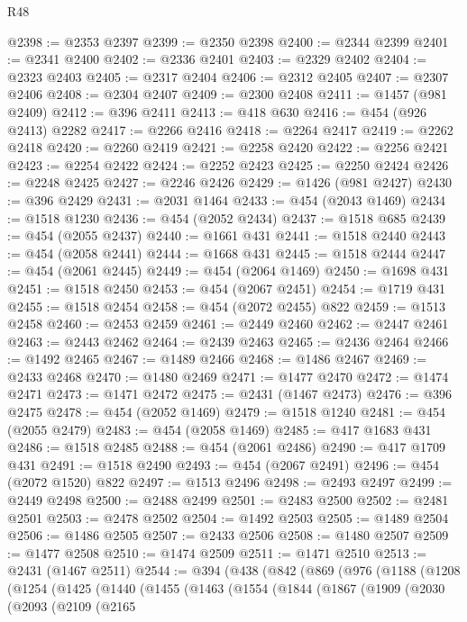 \begin{lexlean}{R48}
\begin{coremodule}
@2398 := @2353 @2397
@2399 := @2350 @2398
@2400 := @2344 @2399
@2401 := @2341 @2400
@2402 := @2336 @2401
@2403 := @2329 @2402
@2404 := @2323 @2403
@2405 := @2317 @2404
@2406 := @2312 @2405
@2407 := @2307 @2406
@2408 := @2304 @2407
@2409 := @2300 @2408
@2411 := @1457 (@981 @2409)
@2412 := @396 @2411
@2413 := @418 @630
@2416 := @454 (@926 @2413) @2282
@2417 := @2266 @2416
@2418 := @2264 @2417
@2419 := @2262 @2418
@2420 := @2260 @2419
@2421 := @2258 @2420
@2422 := @2256 @2421
@2423 := @2254 @2422
@2424 := @2252 @2423
@2425 := @2250 @2424
@2426 := @2248 @2425
@2427 := @2246 @2426
@2429 := @1426 (@981 @2427)
@2430 := @396 @2429
@2431 := @2031 @1464
@2433 := @454 (@2043 @1469)
@2434 := @1518 @1230
@2436 := @454 (@2052 @2434)
@2437 := @1518 @685
@2439 := @454 (@2055 @2437)
@2440 := @1661 @431
@2441 := @1518 @2440
@2443 := @454 (@2058 @2441)
@2444 := @1668 @431
@2445 := @1518 @2444
@2447 := @454 (@2061 @2445)
@2449 := @454 (@2064 @1469)
@2450 := @1698 @431
@2451 := @1518 @2450
@2453 := @454 (@2067 @2451)
@2454 := @1719 @431
@2455 := @1518 @2454
@2458 := @454 (@2072 @2455) @822
@2459 := @1513 @2458
@2460 := @2453 @2459
@2461 := @2449 @2460
@2462 := @2447 @2461
@2463 := @2443 @2462
@2464 := @2439 @2463
@2465 := @2436 @2464
@2466 := @1492 @2465
@2467 := @1489 @2466
@2468 := @1486 @2467
@2469 := @2433 @2468
@2470 := @1480 @2469
@2471 := @1477 @2470
@2472 := @1474 @2471
@2473 := @1471 @2472
@2475 := @2431 (@1467 @2473)
@2476 := @396 @2475
@2478 := @454 (@2052 @1469)
@2479 := @1518 @1240
@2481 := @454 (@2055 @2479)
@2483 := @454 (@2058 @1469)
@2485 := @417 @1683 @431
@2486 := @1518 @2485
@2488 := @454 (@2061 @2486)
@2490 := @417 @1709 @431
@2491 := @1518 @2490
@2493 := @454 (@2067 @2491)
@2496 := @454 (@2072 @1520) @822
@2497 := @1513 @2496
@2498 := @2493 @2497
@2499 := @2449 @2498
@2500 := @2488 @2499
@2501 := @2483 @2500
@2502 := @2481 @2501
@2503 := @2478 @2502
@2504 := @1492 @2503
@2505 := @1489 @2504
@2506 := @1486 @2505
@2507 := @2433 @2506
@2508 := @1480 @2507
@2509 := @1477 @2508
@2510 := @1474 @2509
@2511 := @1471 @2510
@2513 := @2431 (@1467 @2511)
@2544 := @394
    (@438
      (@842
        (@869
          (@976
            (@1188
              (@1208
                (@1254
                  (@1425
                    (@1440
                      (@1455
                        (@1463
                          (@1554
                            (@1844
                              (@1867
                                (@1909
                                  (@2030
                                    (@2093
                                      (@2109
                                        (@2165

\end{coremodule}
\end{lexlean}
